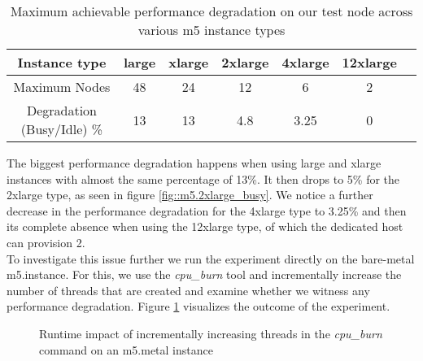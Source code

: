 \begin{table}[H]
\centering
\begin{tabular}{ |c|c|c|c|c|c|c }
 Instance type & large & xlarge & 2xlarge & 4xlarge  & 12xlarge  \\
 \hline
 Maximum Nodes & 48 & 24 & 12 & 6 & 2 \\
 \hline
Degradation (Busy/Idle) \% & 13 & 13 & 4.8 & 3.25 & 0  \\ 

\end{tabular}
\caption{Maximum achievable performance degradation on our test node across various m5 instance types}
\label{tab::all_m5}
\end{table}
\noindent
The biggest performance degradation happens when using large and xlarge instances with almost the same 
percentage of 13\%. It then drops to 5\% for the 2xlarge type, as seen in figure \ref{fig::m5.2xlarge_busy}.
We notice a further decrease in the performance degradation for the 4xlarge type to 3.25\% and then its complete 
absence when using the 12xlarge type, of which the dedicated host can provision 2. \\
To investigate this issue further we run the experiment directly on the bare-metal m5.instance. 
For this, we use the \textit{cpu\_burn} tool and incrementally increase the number of threads that are created 
and examine whether we witness any performance degradation. Figure \ref{fig::m5_metal} visualizes 
the outcome of the experiment. 
\begin{figure}[H]
\centering
{}
\caption{Runtime impact of incrementally increasing threads in the \textit{cpu\_burn} command on an m5.metal instance} 
\label{fig::m5_metal}
\end{figure}
\noindent
